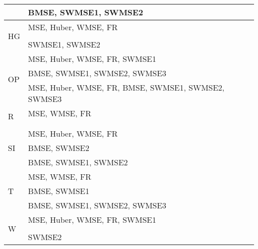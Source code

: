 \documentclass[11pt, a4paper]{article}
\begin{document}
\begin{table}[H]
\begin{tabular}{ll}
                                      & BMSE, SWMSE1, SWMSE2                               \\ \hline
\multirow{3}{*}{HG}                   & MSE, Huber, WMSE, FR                               \\
                                      &                                                    \\
                                      & SWMSE1, SWMSE2                                     \\ \hline
\multirow{3}{*}{OP}                   & MSE, Huber, WMSE, FR, SWMSE1                       \\
                                      & BMSE, SWMSE1, SWMSE2, SWMSE3                       \\
                                      & MSE, Huber, WMSE, FR, BMSE, SWMSE1, SWMSE2, SWMSE3 \\ \hline
\multirow{3}{*}{R}                    & MSE, WMSE, FR                                      \\
                                      &                                                    \\
                                      &                                                    \\ \hline
\multirow{3}{*}{SI}                   & MSE, Huber, WMSE, FR                               \\
                                      & BMSE, SWMSE2                                       \\
                                      & BMSE, SWMSE1, SWMSE2                               \\ \hline
\multirow{3}{*}{T}                    & MSE, WMSE, FR                                      \\
                                      & BMSE, SWMSE1                                       \\
                                      & BMSE, SWMSE1, SWMSE2, SWMSE3                       \\ \hline
\multirow{3}{*}{W}                    & MSE, Huber, WMSE, FR, SWMSE1                       \\
                                      &                                                    \\
                                      & SWMSE2
\end{tabular}
\end{table}
\end{document}
